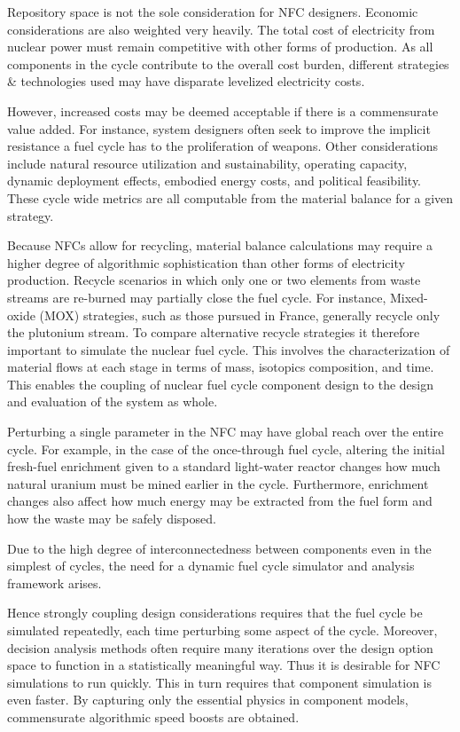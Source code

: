 Repository space is not the sole consideration for NFC designers.  Economic considerations 
are also weighted very heavily.  The total cost of electricity from nuclear power must remain competitive 
with other forms of production.  As all components in the cycle contribute to the overall cost burden, 
different strategies \& technologies used may have disparate levelized electricity costs.

However, increased costs may be deemed acceptable if there is a commensurate value added.
For instance, system designers often seek to improve the implicit resistance a fuel cycle 
has to the proliferation of weapons.  Other considerations include natural resource 
utilization and sustainability, operating capacity, dynamic deployment effects,
embodied energy costs, and political feasibility.  These cycle wide metrics are all computable 
from the material balance for a given strategy. 

Because NFCs allow for recycling, material balance calculations may require a higher degree of
algorithmic sophistication than other forms of electricity production.  
Recycle scenarios in which only one or two 
elements from waste streams are re-burned may partially close the fuel cycle.  
For instance, Mixed-oxide (MOX) strategies, such as those pursued in France, 
generally recycle only the plutonium stream.  
To compare alternative recycle strategies it therefore important to simulate the nuclear fuel cycle.  
This involves the characterization 
of material flows at each stage in terms of mass, isotopics composition, and time.  This enables 
the coupling of nuclear fuel cycle component design to the design and evaluation of the system as whole.  

Perturbing a single parameter in the NFC may have global reach over the entire cycle.
For example, in the case of the once-through fuel cycle, altering the initial fresh-fuel 
 enrichment given to a standard light-water reactor changes how much natural 
uranium must be mined earlier in the cycle.  Furthermore, enrichment changes also affect 
how much energy may be extracted from the fuel form and how the waste may be safely disposed.

Due to the high degree of interconnectedness between components 
even in the simplest of cycles, the need for a dynamic 
fuel cycle simulator and analysis framework arises.

Hence strongly coupling design considerations requires that the fuel cycle be simulated repeatedly, each 
time perturbing some aspect of the cycle.  
Moreover, decision analysis methods often require many iterations over the design option space
to function in a statistically meaningful way.
Thus it is desirable for
NFC simulations to run quickly.  This in turn requires that component simulation is even faster. 
By capturing only the essential physics in component models, commensurate algorithmic speed 
boosts are obtained.


